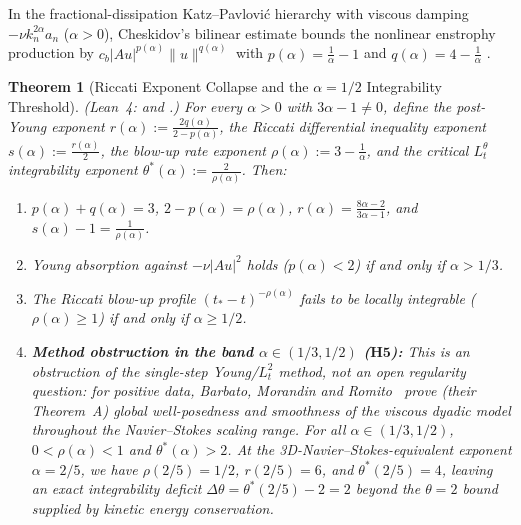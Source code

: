 \documentclass[11pt,a4paper]{article}
\newtheorem{theorem}{Theorem}[section]
\theoremstyle{definition}
\theoremstyle{remark}
\begin{document}
In the fractional-dissipation Katz--Pavlovi\'c hierarchy with viscous damping $-\nu k_n^{2\alpha} a_n$ ($\alpha > 0$), Cheskidov's bilinear estimate bounds the nonlinear enstrophy production by $c_b |A u|^{p(\alpha)} \|u\|^{q(\alpha)}$ with $p(\alpha) = \frac{1}{\alpha} - 1$ and $q(\alpha) = 4 - \frac{1}{\alpha}$ \cite{Cheskidov2008}.

\begin{theorem}[Riccati Exponent Collapse and the $\alpha = 1/2$ Integrability Threshold]\label{thm:riccati}
\emph{(Lean~4:  and .)} For every $\alpha > 0$ with $3\alpha - 1 \ne 0$, define the post-Young exponent $r(\alpha) := \frac{2q(\alpha)}{2-p(\alpha)}$, the Riccati differential inequality exponent $s(\alpha) := \frac{r(\alpha)}{2}$, the blow-up rate exponent $\rho(\alpha) := 3 - \frac{1}{\alpha}$, and the critical $L^\theta_t$ integrability exponent $\theta^*(\alpha) := \frac{2}{\rho(\alpha)}$. Then:
\begin{enumerate}
\item $p(\alpha) + q(\alpha) = 3$, $2 - p(\alpha) = \rho(\alpha)$, $r(\alpha) = \frac{8\alpha - 2}{3\alpha - 1}$, and $s(\alpha) - 1 = \frac{1}{\rho(\alpha)}$.
\item Young absorption against $-\nu |A u|^2$ holds ($p(\alpha) < 2$) if and only if $\alpha > 1/3$.
\item The Riccati blow-up profile $(t_* - t)^{-\rho(\alpha)}$ fails to be locally integrable ($\rho(\alpha) \ge 1$) if and only if $\alpha \ge 1/2$.
\item \textbf{Method obstruction in the band $\alpha \in (1/3, 1/2)$ ($\mathbf{H5}$):} This is an obstruction of the single-step Young/$L^2_t$ method, not an open regularity question: for positive data, Barbato, Morandin and Romito~\cite{BarbatoMorandinRomito2011} prove (their Theorem~A) global well-posedness and smoothness of the viscous dyadic model throughout the Navier--Stokes scaling range. For all $\alpha \in (1/3, 1/2)$, $0 < \rho(\alpha) < 1$ and $\theta^*(\alpha) > 2$. At the 3D-Navier--Stokes-equivalent exponent $\alpha = 2/5$, we have $\rho(2/5) = 1/2$, $r(2/5) = 6$, and $\theta^*(2/5) = 4$, leaving an exact integrability deficit $\Delta\theta = \theta^*(2/5) - 2 = 2$ beyond the $\theta = 2$ bound supplied by kinetic energy conservation.
\end{enumerate}
\end{theorem}
\end{document}
